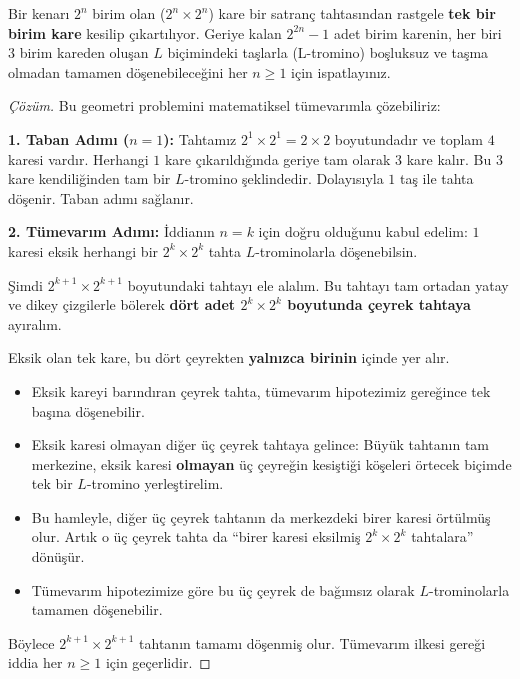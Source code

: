 \begin{example}
Bir kenarı $2^n$ birim olan ($2^n \times 2^n$) kare bir satranç tahtasından rastgele \textbf{tek bir birim kare} kesilip çıkartılıyor. Geriye kalan $2^{2n} - 1$ adet birim karenin, her biri $3$ birim kareden oluşan $L$ biçimindeki taşlarla (L-tromino) boşluksuz ve taşma olmadan tamamen döşenebileceğini her $n \ge 1$ için ispatlayınız.
\end{example}
\begin{proof}[Çözüm]
Bu geometri problemini matematiksel tümevarımla çözebiliriz:

\textbf{1. Taban Adımı ($n = 1$):}
Tahtamız $2^1 \times 2^1 = 2 \times 2$ boyutundadır ve toplam $4$ karesi vardır. Herhangi $1$ kare çıkarıldığında geriye tam olarak $3$ kare kalır. Bu $3$ kare kendiliğinden tam bir $L$-tromino şeklindedir. Dolayısıyla $1$ taş ile tahta döşenir. Taban adımı sağlanır.

\textbf{2. Tümevarım Adımı:}
İddianın $n = k$ için doğru olduğunu kabul edelim: $1$ karesi eksik herhangi bir $2^k \times 2^k$ tahta $L$-trominolarla döşenebilsin.

Şimdi $2^{k+1} \times 2^{k+1}$ boyutundaki tahtayı ele alalım. Bu tahtayı tam ortadan yatay ve dikey çizgilerle bölerek \textbf{dört adet $2^k \times 2^k$ boyutunda çeyrek tahtaya} ayıralım.

Eksik olan tek kare, bu dört çeyrekten \textbf{yalnızca birinin} içinde yer alır. 
\begin{itemize}
  \item Eksik kareyi barındıran çeyrek tahta, tümevarım hipotezimiz gereğince tek başına döşenebilir.
  \item Eksik karesi olmayan diğer üç çeyrek tahtaya gelince: Büyük tahtanın tam merkezine, eksik karesi \textbf{olmayan} üç çeyreğin kesiştiği köşeleri örtecek biçimde tek bir $L$-tromino yerleştirelim.
  \item Bu hamleyle, diğer üç çeyrek tahtanın da merkezdeki birer karesi örtülmüş olur. Artık o üç çeyrek tahta da ``birer karesi eksilmiş $2^k \times 2^k$ tahtalara'' dönüşür.
  \item Tümevarım hipotezimize göre bu üç çeyrek de bağımsız olarak $L$-trominolarla tamamen döşenebilir.
\end{itemize}
Böylece $2^{k+1} \times 2^{k+1}$ tahtanın tamamı döşenmiş olur. Tümevarım ilkesi gereği iddia her $n \ge 1$ için geçerlidir.
\end{proof}


